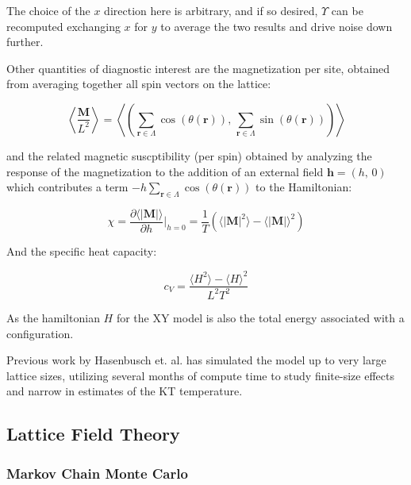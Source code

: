 \documentclass[12pt]{article}
\begin{document}
The choice of the $x$ direction here is arbitrary, and if so desired, $\Upsilon$ can be recomputed exchanging $x$ for $y$ to average the two results
and drive noise down further.

Other quantities of diagnostic interest are the magnetization per site, obtained from averaging together all spin vectors on the lattice:

\begin{equation}
	\left\langle \frac{\mathbf{M}}{L^2} \right\rangle = \left\langle \left( \sum_{\mathbf{r}\in\Lambda} \cos(\theta(\mathbf{r})) ,\,  \sum_{\mathbf{r}\in\Lambda} \sin(\theta(\mathbf{r})) \right) \right\rangle
\end{equation}

and the related magnetic suscptibility (per spin) obtained by analyzing the response of the magnetization to the addition of an external field $\mathbf{h}=(h,\,0)$ which contributes 
a term $-h \sum_{\mathbf{r}\in \Lambda}\cos(\theta(\mathbf{r}))$ to the Hamiltonian:

\begin{equation} \label{eq:susc}
	\chi = \frac{\partial \langle|\mathbf{M}|\rangle}{\partial h}\big|_{h=0} = \frac{1}{T} \left( \langle |\mathbf{M}|^2 \rangle - \langle |\mathbf{M}| \rangle^2 \right)
\end{equation}

And the specific heat capacity:

\begin{equation} \label{eq:heat}
	c_V = \frac{\langle H^2 \rangle - \langle H \rangle^2}{L^2 T^2}
\end{equation}

As the hamiltonian $H$ for the XY model is also the total energy associated with a configuration.

Previous work by Hasenbusch et. al. \cite{Hasenbusch_2005} has simulated the model up to very large lattice sizes, utilizing several months of compute
time to study finite-size effects and narrow in estimates of the KT temperature. 

\subsection{Lattice Field Theory}

\subsubsection{Markov Chain Monte Carlo}
\end{document}
